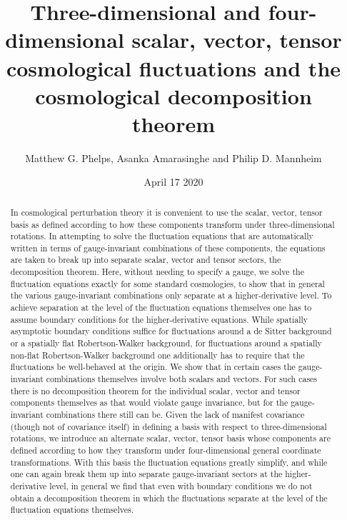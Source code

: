 \documentclass[aps,onecolumn,10pt]{revtex4}
\makeatletter
\numberwithin{equation}{section}
\numberwithin{equation}{section}
\newcommand{\globalcolor}[1]{%
	\color[HTML]{#1}\global\let\default@color\current@color
}
\makeatother
\begin{document}
\globalcolor{EBDBB2}
\allowdisplaybreaks
\setcounter{equation}{0}

 
\title{Three-dimensional and four-dimensional scalar, vector, tensor cosmological fluctuations and the cosmological decomposition theorem}

\author{Matthew G. Phelps, Asanka Amarasinghe  and Philip D. Mannheim}

\date{April 17 2020}

\begin{abstract}


In cosmological perturbation theory it is convenient to use the scalar, vector, tensor  basis as defined according to how these components transform under three-dimensional rotations. In attempting to solve the fluctuation equations that are automatically written in terms of gauge-invariant combinations of these components, the equations are taken to break up into separate scalar, vector and tensor sectors, the decomposition theorem. Here, without needing to specify a gauge, we solve the fluctuation equations exactly for some standard cosmologies, to show that in general the various gauge-invariant combinations only separate at a higher-derivative level. To achieve separation at the level of the fluctuation equations themselves one has to assume boundary conditions for the higher-derivative equations. While spatially asymptotic boundary conditions suffice for fluctuations around a de Sitter background or a spatially flat Robertson-Walker background, for fluctuations around a spatially non-flat Robertson-Walker background one additionally has to require that the fluctuations be well-behaved at the origin. We show that in certain cases the gauge-invariant combinations themselves involve both scalars and vectors. For such cases there is no decomposition theorem for the individual scalar, vector and tensor components  themselves as that would violate gauge invariance, but for the gauge-invariant combinations there still can be. Given the lack of manifest covariance (though not of covariance itself) in defining a basis with respect to three-dimensional rotations, we introduce an alternate scalar, vector, tensor basis whose components are defined according to how they transform under four-dimensional general coordinate transformations. With this basis the fluctuation equations greatly simplify, and while one can again break them up into separate gauge-invariant sectors at the higher-derivative level, in general we find that even with boundary conditions we do not obtain a decomposition theorem in which the fluctuations separate at the level of the fluctuation equations themselves. 



\end{abstract}
\end{document}
